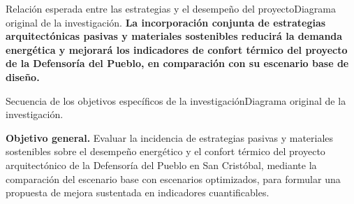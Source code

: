 \begin{landscape}
\begin{pilotoTextoGrafico}{\graficoHipotesisIntro}{Relación esperada entre las estrategias y el desempeño del proyecto}{Diagrama original de la investigación.}
\textbf{La incorporación conjunta de estrategias arquitectónicas pasivas y materiales sostenibles reducirá la demanda energética y mejorará los indicadores de confort térmico del proyecto de la Defensoría del Pueblo, en comparación con su escenario base de diseño.}
\end{pilotoTextoGrafico}


\begin{pilotoTextoGrafico}{\graficoObjetivosIntro}{Secuencia de los objetivos específicos de la investigación}{Diagrama original de la investigación.}

\textbf{Objetivo general.} Evaluar la incidencia de estrategias pasivas y materiales sostenibles sobre el desempeño energético y el confort térmico del proyecto arquitectónico de la Defensoría del Pueblo en San Cristóbal, mediante la comparación del escenario base con escenarios optimizados, para formular una propuesta de mejora sustentada en indicadores cuantificables.
\end{pilotoTextoGrafico}



\end{landscape}
